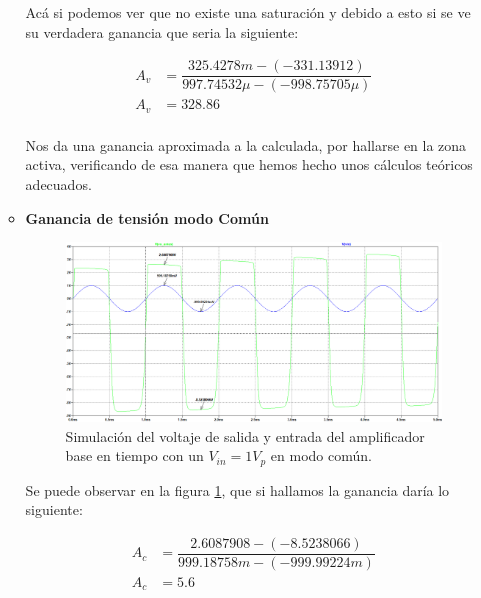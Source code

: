 \begin{enumerate}
\begin{itemize}
                Acá si podemos ver que no existe una saturación y debido a esto si se ve su verdadera ganancia que seria la siguiente:

                \begin{align*}
                  A_v & =\dfrac{325.4278m-(-331.13912)}{997.74532\mu-(-998.75705\mu)} \\[0.2cm]
                  A_v & =328.86                                                       \\[0.2cm]
                \end{align*}

                Nos da una ganancia aproximada a la calculada, por hallarse en la zona activa, verificando de esa manera que hemos hecho unos cálculos teóricos adecuados.
                \newpage
          \item \textbf{Ganancia de tensión modo Común}

                \begin{figure}[H]
                  \centering
                  \includegraphics[width=\textwidth]{Imagenes/sim_basecomun_1.png}
                  \caption{Simulación del voltaje de salida y entrada del amplificador base en tiempo con un $V_{in}=1V_p$ en modo común.}
                  \label{fig:sim_basecomun_1}
                \end{figure}

                Se puede observar en la figura \ref{fig:sim_basecomun_1}, que si hallamos la ganancia daría lo siguiente:

                \begin{align*}
                  A_c & =\dfrac{2.6087908-(-8.5238066)}{999.18758m-(-999.99224m)} \\[0.2cm]
                  A_c & =5.6                                                      \\[0.2cm]
                \end{align*}


\end{itemize}
\end{enumerate}
